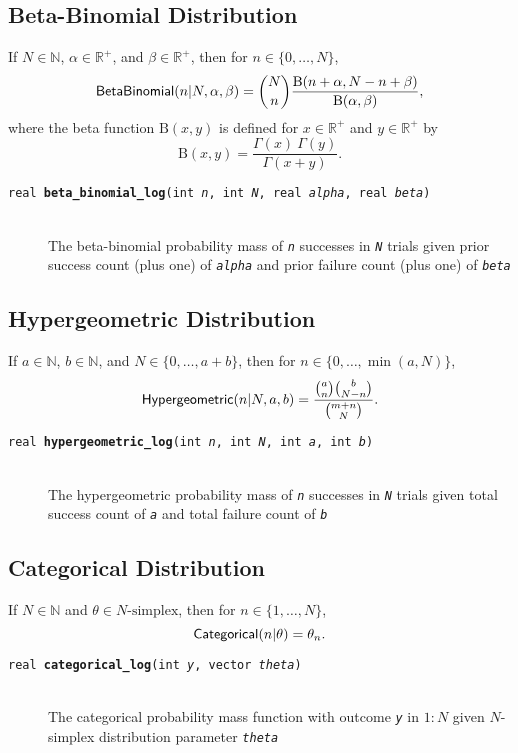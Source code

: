 \documentclass[10pt]{report}
\newcommand{\distro}[1]{\mbox{\sf #1}}
\newcommand{\Betafun}{\mbox{B}}
\newcommand{\setlist}[1]{\{ #1 \}}
\newcommand{\posreals}{\mathbb{R}^+}
\newcommand{\nats}{\mathbb{N}}
\newcommand{\fitem}[4]{\item[{\tt #1 {\bfseries #2}(#3)}]\mbox{ } \\[4pt] #4}
\newcommand{\farg}[1]{{\tt\slshape #1}}
\begin{document}
\subsection{Beta-Binomial Distribution}

If $N \in \nats$, $\alpha \in \posreals$, and $\beta \in \posreals$,
then for $n \in \setlist{0,\ldots,N}$,
\[
\distro{BetaBinomial}(n|N,\alpha,\beta)
= 
{N \choose n} \frac{\Betafun(n+\alpha, N -n +
  \beta)}{\Betafun(\alpha,\beta)},
\]
%
where the beta function $\Betafun(x,y)$ is defined for $x \in
\posreals$ and $y \in \posreals$ by
%
\[
\Betafun(x,y)
= \frac{\Gamma(x) \ \Gamma(y)}{\Gamma(x + y)}.
\]

\begin{description}
%
\fitem{real}{beta\_binomial\_log}{int \farg{n}, int \farg{N}, real
  \farg{alpha}, real \farg{beta}}{The beta-binomial probability mass
  of \farg{n} successes in \farg{N} trials given prior success count
  (plus one) of \farg{alpha} and prior failure count (plus one) of
  \farg{beta}}
%
\end{description}


\subsection{Hypergeometric Distribution}

If $a \in \nats$, $b \in \nats$, and $N \in \setlist{0,\ldots,a+b}$,
then for $n \in \setlist{0,\ldots,\min(a,N)}$, 
\[
\distro{Hypergeometric}(n|N,a,b)
=
\frac{\normalsize{a \choose n} {b \choose {N - n}}}
     {\normalsize{{m + n} \choose N}}.
\]

\begin{description}
%
  \fitem{real}{hypergeometric\_log}{int \farg{n}, int \farg{N}, int
    \farg{a}, int \farg{b}}{The hypergeometric probability mass of
    \farg{n} successes in \farg{N} trials given total success count of
    \farg{a} and total failure count of \farg{b}}

%
\end{description}

\subsection{Categorical Distribution}

If $N \in \nats$ and $\theta \in \mbox{$N$-simplex}$, then for $n \in
\setlist{1,\ldots,N}$, 
\[
\distro{Categorical}(n|\theta) = \theta_n.
\]

\begin{description}
%
\fitem{real}{categorical\_log}{int \farg{y}, vector \farg{theta}}{The
 categorical probability mass function with outcome \farg{y} in 
$1:N$ given $N$-simplex distribution parameter \farg{theta}}
%
\end{description}
\end{document}

